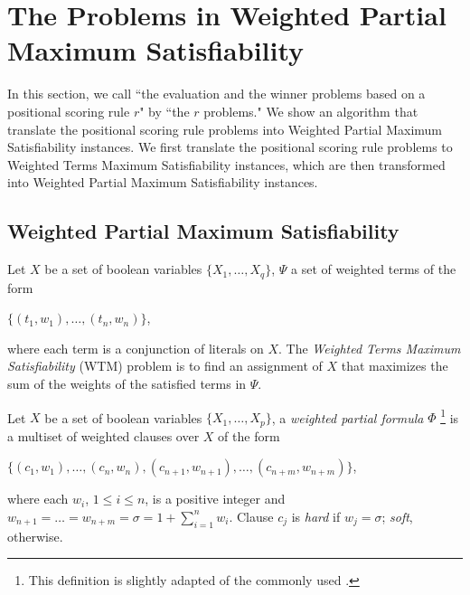 \section{The Problems in Weighted Partial Maximum Satisfiability}
In this section, we call ``the evaluation and the winner
problems based on a positional scoring rule $r$" by ``the $r$ problems."
We show an algorithm that translate the positional scoring rule problems into 
Weighted Partial Maximum Satisfiability instances.
We first translate the positional scoring rule problems to Weighted
Terms Maximum Satisfiability instances, which are then transformed
into Weighted Partial Maximum Satisfiability instances.

\subsection{Weighted Partial Maximum Satisfiability}
\begin{definition}
	Let $X$ be a set of boolean variables $\{X_1, \ldots, X_q\}$, 
	$\Psi$ a set of weighted terms of the form
	\begin{center}
  $\{(t_1,w_1), \ldots, (t_n,w_n)\}$, 
	\end{center}
	where each term is a conjunction of literals on $X$.
	The \textit{Weighted Terms Maximum Satisfiability} (WTM) problem
	is to find an assignment of $X$ that 
	maximizes the sum of the weights of the satisfied terms in $\Psi$.
\end{definition}

\begin{definition}
	Let $X$ be a set of boolean variables $\{X_1, \ldots, X_p\}$, 
	a \textit{weighted partial formula} $\Phi$ 
	\footnote{This definition is slightly adapted of the commonly used
	\cite{ansotegui2010new,ansotegui2009solving}.}
	is a multiset of weighted clauses over $X$
	of the form 
	\begin{center}
  $\{(c_1,w_1), \ldots, (c_n,w_n), (c_{n+1},w_{n+1}), \ldots, (c_{n+m},w_{n+m})\}$, 
	\end{center}
	where each $w_i$, $1 \leq i \leq n$, is a positive integer and
	$w_{n+1}=\ldots=w_{n+m}=\sigma=1+\sum^n_{i=1} w_i$.  Clause $c_j$
	is \textit{hard} if $w_j=\sigma$; \textit{soft}, otherwise.
\end{definition}

